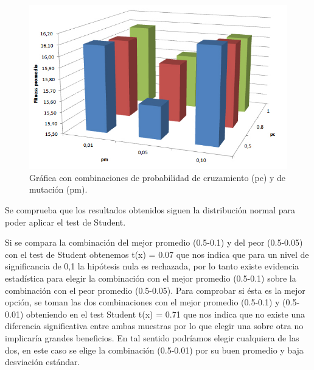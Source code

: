\begin{figure}[H]
	\centering
	\includegraphics[width=0.8\linewidth]{Figures/grafica_mutacion_cruzamiento}
	\caption[Gráfica con combinaciones de probabilidad de cruzamiento y de mutación.]{Gráfica con combinaciones de probabilidad de cruzamiento (pc) y de mutación (pm).}
	\label{fig:grafica_mutacion_cruzamiento}
\end{figure}


Se comprueba que los resultados obtenidos siguen la distribución normal para poder aplicar el test de Student. 

%
%

Si se compara la combinación del mejor promedio (0.5-0.1) y del peor (0.5-0.05) con el test de Student obtenemos t(x) = 0.07 que nos indica que para un nivel de significancia de  0,1 la hipótesis nula es rechazada, por lo tanto existe evidencia estadística para elegir la combinación con el mejor promedio (0.5-0.1) sobre la combinación con el peor promedio (0.5-0.05). Para comprobar si ésta es la mejor opción, se toman las dos combinaciones con el mejor promedio (0.5-0.1) y (0.5-0.01) obteniendo en el test Student t(x) = 0.71 que nos indica que no existe una diferencia significativa entre ambas muestras por lo que elegir una sobre otra no implicaría grandes beneficios. En tal sentido podríamos elegir cualquiera de las dos, en este caso se elige la combinación (0.5-0.01) por su buen promedio y baja desviación estándar.



